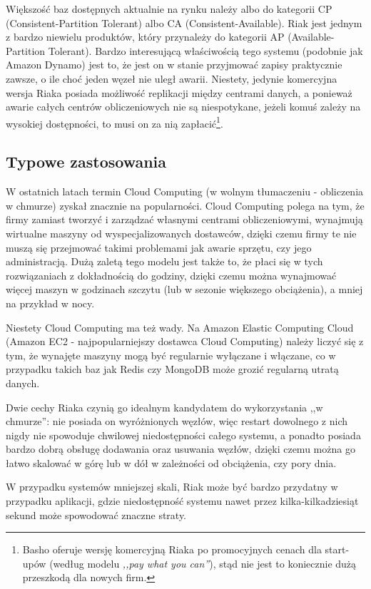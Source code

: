 Większość baz dostępnych aktualnie na rynku należy albo do kategorii CP (Consistent-Partition Tolerant) albo CA (Consistent-Available).
Riak jest jednym z bardzo niewielu produktów, który przynależy do kategorii AP (Available-Partition Tolerant).
Bardzo interesującą właściwością tego systemu (podobnie jak Amazon Dynamo) jest to, że jest on w stanie przyjmować zapisy praktycznie zawsze, o ile choć jeden węzeł nie uległ awarii.
Niestety, jedynie komercyjna wersja Riaka posiada możliwość replikacji między centrami danych, a ponieważ awarie całych centrów obliczeniowych nie są niespotykane, jeżeli komuś zależy na wysokiej dostępności, to musi on za nią zapłacić\footnote{Basho oferuje wersję komercyjną Riaka po promocyjnych cenach dla start-upów (według modelu \emph{,,pay what you can''}), stąd nie jest to koniecznie dużą przeszkodą dla nowych firm.}.

\subsection*{Typowe zastosowania}

W ostatnich latach termin Cloud Computing (w wolnym tłumaczeniu - obliczenia w chmurze) zyskał znacznie na popularności.
Cloud Computing polega na tym, że firmy zamiast tworzyć i zarządzać własnymi centrami obliczeniowymi, wynajmują wirtualne maszyny od wyspecjalizowanych dostawców, dzięki czemu firmy te nie muszą się przejmować takimi problemami jak awarie sprzętu, czy jego administracją.
Dużą zaletą tego modelu jest także to, że płaci się w tych rozwiązaniach z dokładnością do godziny, dzięki czemu można wynajmować więcej maszyn w godzinach szczytu (lub w sezonie większego obciążenia), a mniej na przykład w nocy.

Niestety Cloud Computing ma też wady.
Na Amazon Elastic Computing Cloud (Amazon EC2 - najpopularniejszy dostawca Cloud Computing) należy liczyć się z tym, że wynajęte maszyny mogą być regularnie wyłączane i włączane, co w przypadku takich baz jak Redis czy MongoDB może grozić regularną utratą danych.

Dwie cechy Riaka czynią go idealnym kandydatem do wykorzystania ,,w chmurze'': nie posiada on wyróżnionych węzłów, więc restart dowolnego z nich nigdy nie spowoduje chwilowej niedostępności całego systemu, a ponadto posiada bardzo dobrą obsługę dodawania oraz usuwania węzłów, dzięki czemu można go łatwo skalować w górę lub w dół w zależności od obciążenia, czy pory dnia.

W przypadku systemów mniejszej skali, Riak może być bardzo przydatny w przypadku aplikacji, gdzie niedostępność systemu nawet przez kilka-kilkadziesiąt sekund może spowodować znaczne straty.

